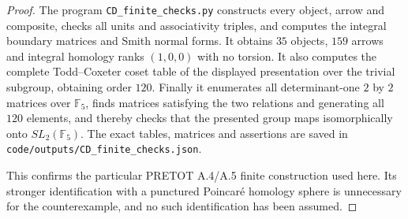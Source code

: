 \begin{proof}
The program \texttt{CD\_finite\_checks.py} constructs every object, arrow and composite, checks all units and associativity triples, and computes the integral boundary matrices and Smith normal forms. It obtains $35$ objects, $159$ arrows and integral homology ranks $(1,0,0)$ with no torsion. It also computes the complete Todd--Coxeter coset table of the displayed presentation over the trivial subgroup, obtaining order $120$. Finally it enumerates all determinant-one $2$ by $2$ matrices over $\mathbb F_5$, finds matrices satisfying the two relations and generating all $120$ elements, and thereby checks that the presented group maps isomorphically onto $SL_2(\mathbb F_5)$. The exact tables, matrices and assertions are saved in \texttt{code/outputs/CD\_finite\_checks.json}.

This confirms the particular PRETOT A.4/A.5 finite construction used here. Its stronger identification with a punctured Poincar\'e homology sphere is unnecessary for the counterexample, and no such identification has been assumed.
\end{proof}

